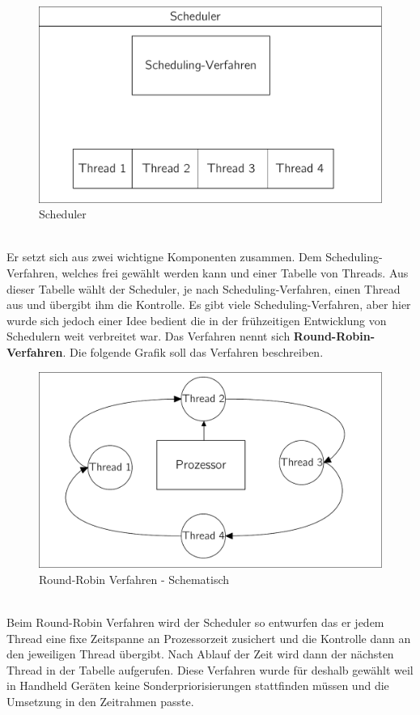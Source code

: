 \begin{figure}[h!]
	\centering
	\includegraphics[scale=0.60]{common/draft-scheduler.pdf}	
	\caption{Scheduler}
	\label{draft:draft-scheduler}
\end{figure}\\
Er setzt sich aus zwei wichtigne Komponenten zusammen. Dem Scheduling-Verfahren, welches frei gew\"ahlt werden kann und einer Tabelle von Threads. Aus dieser Tabelle w\"ahlt der Scheduler, je nach Scheduling-Verfahren, einen Thread aus und \"ubergibt ihm die Kontrolle. Es gibt viele Scheduling-Verfahren, aber hier wurde sich jedoch einer Idee bedient die in der fr\"uhzeitigen Entwicklung von Schedulern weit verbreitet war. 
\newpage\noindent
Das Verfahren nennt sich \textbf{Round-Robin-Verfahren}. Die folgende Grafik soll das Verfahren beschreiben.
\begin{figure}[h!]
	\centering
	\includegraphics[scale=0.60]{common/draft-roundrobin.pdf}	
	\caption{Round-Robin Verfahren - Schematisch}
	\label{draft:draft-roundrobin}
\end{figure}\\
Beim Round-Robin Verfahren wird der Scheduler so entwurfen das er jedem Thread eine fixe Zeitspanne an Prozessorzeit zusichert und die Kontrolle dann an den jeweiligen Thread \"ubergibt. Nach Ablauf der Zeit wird dann der n\"achsten Thread in der Tabelle aufgerufen. Diese Verfahren wurde f\"ur \mops deshalb gew\"ahlt weil in Handheld Ger\"aten keine Sonderpriorisierungen stattfinden m\"ussen und die Umsetzung in den Zeitrahmen passte.